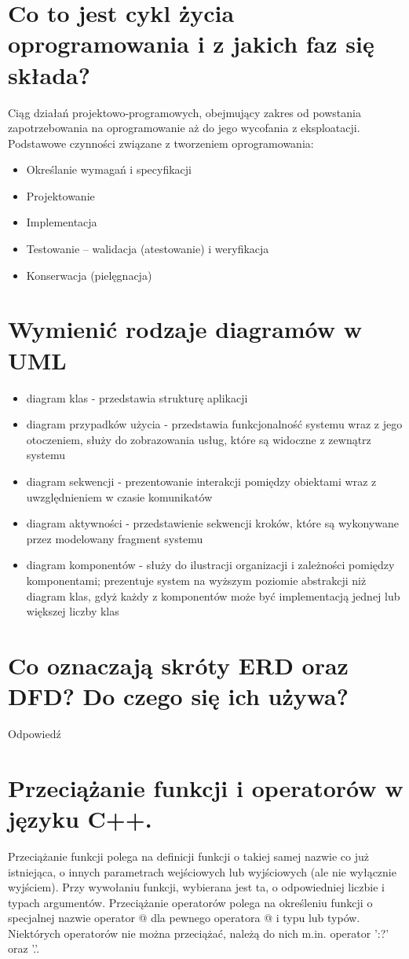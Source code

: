 \documentclass[12pt,a4paper]{article}
\begin{document}
	\section{Co to jest cykl życia oprogramowania i z jakich faz się składa?}
	Ciąg działań projektowo-programowych, obejmujący zakres od powstania zapotrzebowania na oprogramowanie aż do jego wycofania z eksploatacji. Podstawowe czynności związane z tworzeniem oprogramowania:
	\begin{itemize}
		\item Określanie wymagań i specyfikacji
		\item Projektowanie
		\item Implementacja
		\item Testowanie – walidacja (atestowanie) i weryfikacja
		\item Konserwacja (pielęgnacja)
	\end{itemize}

	\section{Wymienić rodzaje diagramów w UML}
	\begin{itemize}
		\item diagram klas - przedstawia strukturę aplikacji
		\item diagram przypadków użycia - przedstawia funkcjonalność systemu wraz z jego otoczeniem, służy do zobrazowania usług, które są widoczne z zewnątrz systemu
		\item diagram sekwencji - prezentowanie interakcji pomiędzy obiektami wraz z uwzględnieniem w czasie komunikatów
		\item diagram aktywności - przedstawienie sekwencji kroków, które są wykonywane przez modelowany fragment systemu
		\item diagram komponentów - służy do ilustracji organizacji i zależności pomiędzy komponentami; prezentuje system na wyższym poziomie abstrakcji niż diagram klas, gdyż każdy z komponentów może być implementacją jednej lub większej liczby klas
	\end{itemize}

	\section{Co oznaczają skróty ERD oraz DFD? Do czego się ich używa?}
	Odpowiedź

	\section{Przeciążanie funkcji i operatorów w języku C++.}
	\label{sec:przecfuncpp}
	Przeciążanie funkcji polega na definicji funkcji o takiej samej nazwie co już istniejąca, o innych parametrach wejściowych lub wyjściowych (ale nie wyłącznie wyjściem). Przy wywołaniu funkcji, wybierana jest ta, o odpowiedniej liczbie i typach argumentów.
	Przeciążanie operatorów polega na określeniu funkcji o specjalnej nazwie operator @ dla pewnego operatora @ i typu lub typów. Niektórych operatorów nie można przeciążać, należą do nich m.in. operator ':?' oraz '.'.
\end{document}
